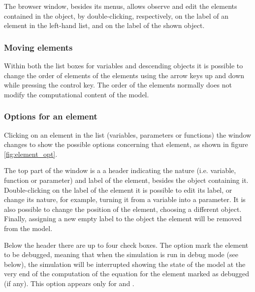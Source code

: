 \documentclass [11pt,a4paper] {book}
\begin{document}
The browser window, besides its menus, allows observe and edit the elements contained in the object, by double-clicking, respectively, on the label of an element in the left-hand list, and on the label of the shown object. 

\subsubsection{Moving elements}
Within both the list boxes for variables and descending objects it is possible to change the order of elements of the elements using the arrow keys up and down while pressing the control key. The order of the elements normally does not modify the computational content of the model.

\subsubsection{Options for an element}\label{subsub:opt_ele}

Clicking on an element in the  list (variables, parameters or functions) the window changes to show the possible options concerning that element, as shown in figure \ref{fig:element_opt}.

The top part of the window is a a header indicating the nature (i.e. variable, function or parameter) and label of the element, besides the object containing it. Double-clicking on the label of the element it is possible to edit its label, or change its nature, for example, turning it from a variable into a parameter. It is also possible to change the position of the element, choosing a different object. Finally, assigning a new empty label to the object the element will be removed from the model.

Below the header there are up to four check boxes. The option  mark the element to be debugged, meaning that when the simulation is run in debug mode (see below), the simulation will be interrupted showing the state of the model at the very end of the computation of the equation for the element marked as debugged (if any). This option appears only for  and .
\end{document}
